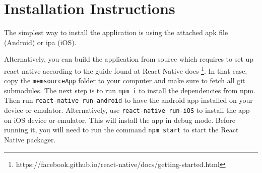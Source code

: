 \chapter{Installation Instructions}

The simplest way to install the application is using the attached apk file (Android) or ipa (iOS).


Alternatively, you can build the application from source which requires to set up react native according to the guide found at React Native docs \footnote{https://facebook.github.io/react-native/docs/getting-started.html}. In that case, copy the \texttt{memsourceApp} folder to your computer and make sure to fetch all git submodules. The next step is to run \texttt{npm i} to install the dependencies from npm. Then run \texttt{react-native run-android} to have the android app installed on your device or emulator. Alternatively, use \texttt{react-native run-iOS} to install the app on iOS device or emulator. This will install the app in debug mode. Before running it, you will need to run the command \texttt{npm start} to start the React Native packager.